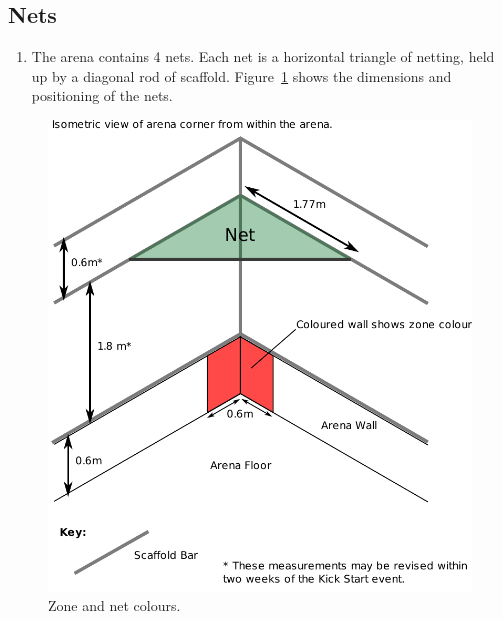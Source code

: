 \subsection{Nets}
\begin{enumerate}
\item The arena contains 4 nets.  Each net is a horizontal triangle of netting, held up by a diagonal rod of scaffold. Figure~\ref{fig:nets} shows the dimensions and positioning of the nets.
\end{enumerate}

\begin{figure}
\begin{center}
\includegraphics[keepaspectratio, scale =1]{./images/net.pdf}
\caption{\label{fig:nets}Zone and net colours.}
\end{center}
\end{figure}


